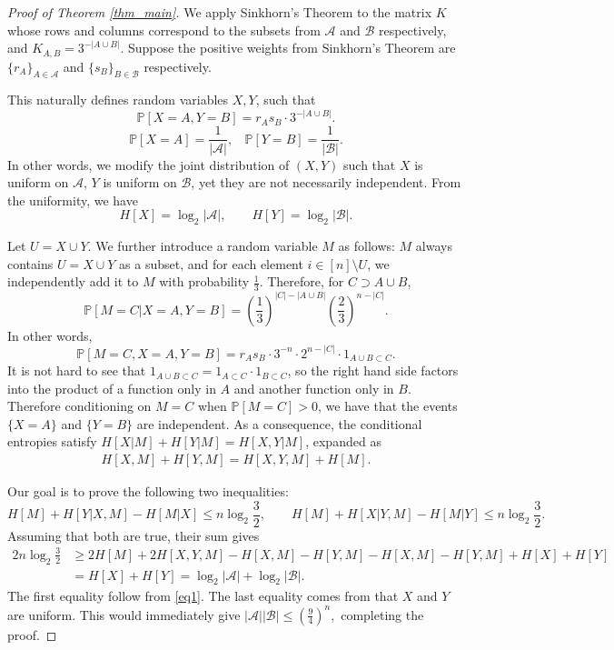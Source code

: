 \documentclass{article}
\begin{document}
\begin{proof}[Proof of Theorem \ref{thm_main}]
We apply Sinkhorn's Theorem to the matrix $K$ whose rows and columns correspond to the subsets from $\mathcal{A}$ and $\mathcal{B}$ respectively, and $K_{A, B}=3^{-|A \cup B|}$. Suppose the positive weights from Sinkhorn's Theorem are $\{r_A\}_{A \in \mathcal{A}}$ and $\{s_B\}_{B \in \mathcal{B}}$ respectively. 

This naturally defines random variables $X, Y$, such that 
$$\mathbb{P}[X=A, Y=B]=r_A s_B \cdot 3^{-|A \cup B|}.$$
$$\mathbb{P}[X=A]=\frac{1}{|\mathcal{A}|},~~~~\mathbb{P}[Y=B]=\frac{1}{|\mathcal{B}|}.$$
In other words, we modify the joint distribution of $(X, Y)$ such that $X$ is uniform on $\mathcal{A}$, $Y$ is uniform on $\mathcal{B}$, yet they are not necessarily independent. From the uniformity, we have 
$$H[X]=\log_2 |\mathcal{A}|, \qquad H[Y]=\log_2|\mathcal{B}|.$$

Let $U=X \cup Y$. We further introduce a random variable $M$ as follows: $M$ always contains $U=X  \cup Y$ as a subset, and for each element $i \in [n] \setminus U$, we independently add it to $M$ with probability $\frac{1}{3}$. Therefore, for $C \supset A \cup B$,
$$\mathbb{P}[M=C|X=A, Y=B]=\left(\frac{1}{3}\right)^{|C|-|A \cup B|}\left(\frac{2}{3}\right)^{n-|C|}.$$
In other words,
$$\mathbb{P}[M=C, X=A, Y=B]=r_A s_B \cdot 3^{-n} \cdot 2^{n-|C|}\cdot 1_{A \cup B \subset C}.$$
It is not hard to see that $1_{A \cup B \subset C}=1_{A \subset C} \cdot 1 _{B \subset C}$, so the right hand side factors into the product of a function only in $A$ and another function only in $B$. Therefore conditioning on $M=C$ when $\mathbb{P}[M=C]>0$, we have that the events $\{X=A\}$ and $\{Y=B\}$ are independent. As a consequence, the conditional entropies satisfy $H[X|M]+H[Y|M]=H[X,Y|M]$, expanded as
\begin{align}\label{eq1}
H[X,M]+H[Y,M]=H[X,Y,M]+H[M].
\end{align}


Our goal is to prove the following two inequalities:
$$H[M]+H[Y|X,M]-H[M|X] \le n \log_2 \frac{3}{2}, \qquad H[M]+H[X|Y,M]-H[M|Y] \le n \log_2 \frac{3}{2}.$$
Assuming that both are true, their sum gives
\begin{align*}
2n \log_2 \frac{3}{2} &\ge 2H[M]+2H[X,Y,M]-H[X,M]-H[Y,M]-H[X,M]-H[Y,M]+H[X]+H[Y]\\
&=H[X]+H[Y] = \log_2 |\mathcal{A}|+\log_2|\mathcal{B}|.
\end{align*}
The first equality follow from \eqref{eq1}. The last equality comes from that $X$ and $Y$ are uniform. This would immediately give $|\mathcal{A}||\mathcal{B}| \le \left(\frac{9}{4}\right)^n,$ completing the proof. 


\end{proof}
\end{document}
